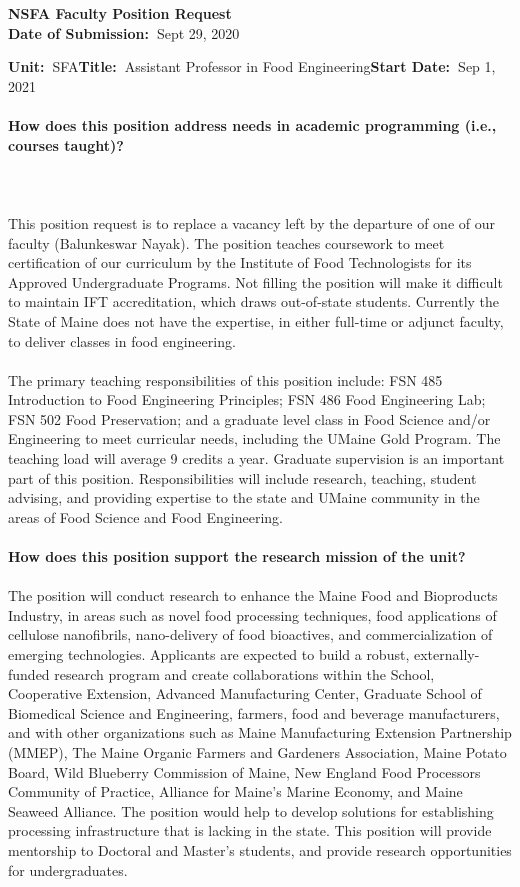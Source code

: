 \documentclass[11pt]{article}
\begin{document}
\sloppy \rmfamily
\begin{center}\textbf{NSFA Faculty Position Request\\Date of Submission:~}Sept 29, 2020\end{center}

\noindent\textbf{Unit:~}SFA\hfill\textbf{Title:~}Assistant Professor in Food Engineering\hfill \textbf{Start Date:~}Sep 1, 2021\\~\\
\textbf{How does this position address needs in academic programming (i.e., courses taught)?}\\~\\
\small\sffamily 
\\~\\
This position request is to replace a vacancy left by the departure of one of our faculty (Balunkeswar Nayak).  The position teaches coursework to meet certification of our curriculum by the Institute of Food Technologists for its Approved Undergraduate Programs. Not filling the position will make it difficult to maintain IFT accreditation, which draws out-of-state students. Currently the State of Maine does not have the expertise, in either full-time or adjunct faculty, to deliver classes in food engineering.
\\~\\
The primary teaching responsibilities of this position include: FSN 485 Introduction to Food Engineering Principles; FSN 486 Food Engineering Lab; FSN 502 Food Preservation; and a graduate level class in Food Science and/or Engineering to meet curricular needs, including the UMaine Gold Program. The teaching load will average 9 credits a year. Graduate supervision is an important part of this position. Responsibilities will include research, teaching, student advising, and providing expertise to the state and UMaine community in the areas of Food Science and Food Engineering.
\\~\\
\textbf{\rmfamily How does this position support the research mission of the unit?}\\~\\
The position will conduct research to enhance the Maine Food and Bioproducts Industry, in areas such as novel food processing techniques, food applications of cellulose nanofibrils, nano-delivery of food bioactives, and commercialization of emerging technologies. Applicants are expected to build a robust, externally-funded research program and create collaborations within the School, Cooperative Extension, Advanced Manufacturing Center, Graduate School of Biomedical Science and Engineering, farmers, food and beverage manufacturers, and with other organizations such as Maine Manufacturing Extension Partnership (MMEP), The Maine Organic Farmers and Gardeners Association, Maine Potato Board, Wild Blueberry Commission of Maine, New England Food Processors Community of Practice, Alliance for Maine's Marine Economy, and Maine Seaweed Alliance. The position would help to develop solutions for establishing processing infrastructure that is lacking in the state. This position will provide mentorship to Doctoral and Master’s students, and provide research opportunities for undergraduates.
\end{document}
